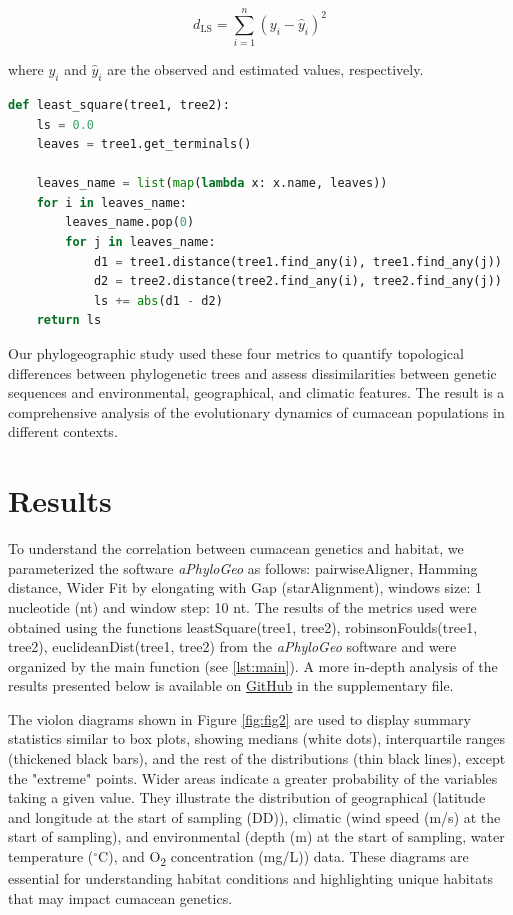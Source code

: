\begin{equation}\label{eq:ls}
    d_{\text{LS}} = \sum_{i=1}^{n} (y_i - \hat{y}_i)^2
\end{equation}

where $y_i$ and $\hat{y}_i$ are the observed and estimated values, respectively.

\begin{lstlisting}[label=lst:LeastSquare, language=Python, caption=Python script for calculating the Least-Square distance using the ete3 package in the aPhyloGeo package]
def least_square(tree1, tree2):
    ls = 0.0
    leaves = tree1.get_terminals()

    leaves_name = list(map(lambda x: x.name, leaves))
    for i in leaves_name:
        leaves_name.pop(0)
        for j in leaves_name:
            d1 = tree1.distance(tree1.find_any(i), tree1.find_any(j))
            d2 = tree2.distance(tree2.find_any(i), tree2.find_any(j))
            ls += abs(d1 - d2)
    return ls
\end{lstlisting}

Our phylogeographic study used these four metrics to quantify topological differences between phylogenetic trees and assess dissimilarities between genetic sequences and environmental, geographical, and climatic features. The result is a comprehensive analysis of the evolutionary dynamics of cumacean populations in different contexts.

\section{Results}\label{results}
To understand the correlation between cumacean genetics and habitat, we parameterized the software \textit{aPhyloGeo} as follows: pairwiseAligner, Hamming distance, Wider Fit by elongating with Gap (starAlignment), windows size: 1 nucleotide (nt) and window step: 10 nt. The results of the metrics used were obtained using the functions leastSquare(tree1, tree2), robinsonFoulds(tree1, tree2), euclideanDist(tree1, tree2) from the \textit{aPhyloGeo} software and were organized by the main function (see \autoref{lst:main}). A more in-depth analysis of the results presented below is available on \href{https://github.com/tahiri-lab/Cumacea_aPhyloGeo}{GitHub} in the supplementary file.

The violon diagrams shown in Figure \ref{fig:fig2} are used to display summary statistics similar to box plots, showing medians (white dots), interquartile ranges (thickened black bars), and the rest of the distributions (thin black lines), except the "extreme" points. Wider areas indicate a greater probability of the variables taking a given value. They illustrate the distribution of geographical (latitude and longitude at the start of sampling (DD)), climatic (wind speed (m/s) at the start of sampling), and environmental (depth (m) at the start of sampling, water temperature ($^\circ$C), and O\textsubscript{2} concentration (mg/L)) data. These diagrams are essential for understanding habitat conditions and highlighting unique habitats that may impact cumacean genetics. 


